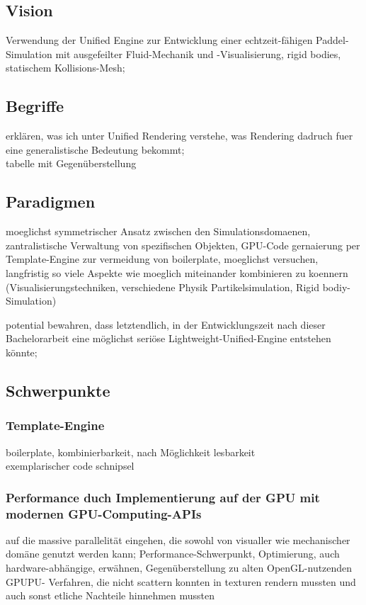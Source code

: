 
\subsection{Vision}
Verwendung der Unified Engine zur Entwicklung einer echtzeit-fähigen Paddel-Simulation mit ausgefeilter Fluid-Mechanik und -Visualisierung, rigid bodies, statischem Kollisions-Mesh;

\subsection{Begriffe}
erklären, was ich unter Unified Rendering verstehe, was Rendering dadruch fuer eine generalistische Bedeutung bekommt;\\
tabelle mit Gegenüberstellung


\subsection{Paradigmen}
	
	moeglichst symmetrischer Ansatz zwischen den Simulationsdomaenen,
	 zantralistische Verwaltung von spezifischen Objekten,
	GPU-Code gernaierung per Template-Engine zur vermeidung von boilerplate,
	moeglichst versuchen, langfristig so viele Aspekte wie moeglich miteinander kombinieren zu koennern 	    
	(Visualisierungstechniken, verschiedene Physik Partikelsimulation, Rigid bodiy-Simulation)
	
	potential bewahren, dass letztendlich, in der Entwicklungszeit nach dieser Bachelorarbeit eine möglichst seriöse Lightweight-Unified-Engine entstehen  könnte;
	
\subsection{Schwerpunkte}

\subsubsection{Template-Engine}
boilerplate, kombinierbarkeit, nach Möglichkeit lesbarkeit\\
exemplarischer code schnipsel

\subsubsection{Performance duch Implementierung auf der GPU mit modernen GPU-Computing-APIs}
auf die massive parallelität eingehen, die sowohl von visualler wie mechanischer domäne genutzt werden kann;
Performance-Schwerpunkt, Optimierung, auch hardware-abhängige, erwähnen, Gegenüberstellung zu alten OpenGL-nutzenden GPUPU- Verfahren, die nicht scattern konnten in texturen rendern mussten und auch sonst etliche Nachteile hinnehmen mussten

